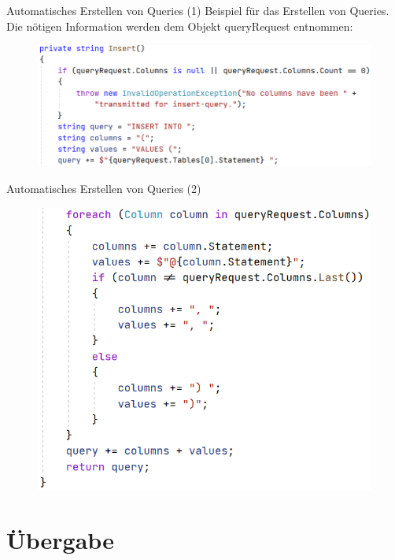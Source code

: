 \documentclass[toc]{beamer}
\begin{document}
        \begin{frame}{Automatisches Erstellen von Queries (1)}
            Beispiel für das Erstellen von Queries. Die nötigen Information werden dem Objekt \glqq queryRequest\grqq{} entnommen:
            \begin{figure}[htp]
                \includegraphics[scale=0.37,left]{insert0.PNG}
            \end{figure}
        \end{frame}
        
        \begin{frame}{Automatisches Erstellen von Queries (2)}
            \begin{figure}[htp]
                \includegraphics[scale=0.35,left]{insert_crop.PNG}
            \end{figure}
        \end{frame}
        
\section{Übergabe}
\end{document}
